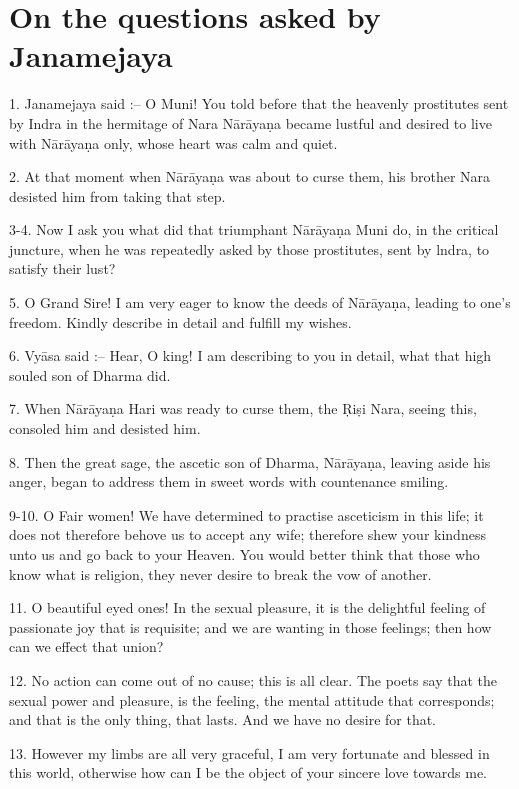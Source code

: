 \chapter{On the questions asked by Janamejaya}

1. Janamejaya said :-- O Muni! You told before that the heavenly prostitutes sent by Indra in the hermitage of Nara N\=ar\=aya\d{n}a became lustful and desired to live with N\=ar\=aya\d{n}a only, whose heart was calm and quiet.

2. At that moment when N\=ar\=aya\d{n}a was about to curse them, his brother Nara desisted him from taking that step.

3-4. Now I ask you what did that triumphant N\=ar\=aya\d{n}a Muni do, in the critical juncture, when he was repeatedly asked by those prostitutes, sent by lndra, to satisfy their lust?

5. O Grand Sire! I am very eager to know the deeds of N\=ar\=aya\d{n}a, leading to one's freedom. Kindly describe in detail and fulfill my wishes.

6. Vy\=asa said :-- Hear, O king! I am describing to you in detail, what that high souled son of Dharma did.

7. When N\=ar\=aya\d{n}a Hari was ready to curse them, the \d{R}i\d{s}i Nara, seeing this, consoled him and desisted him.

8. Then the great sage, the ascetic son of Dharma, N\=ar\=aya\d{n}a, leaving aside his anger, began to address them in sweet words with countenance smiling.

9-10. O Fair women! We have determined to practise asceticism in this life; it does not therefore behove us to accept any wife; therefore shew your kindness unto us and go back to your Heaven. You would better think that those who know what is religion, they never desire to break the vow of another.

11. O beautiful eyed ones! In the sexual pleasure, it is the delightful feeling of passionate joy that is requisite; and we are wanting in those feelings; then how can we effect that union?

12. No action can come out of no cause; this is all clear. The poets say that the sexual power and pleasure, is the feeling, the mental attitude that corresponds; and that is the only thing, that lasts. And we have no desire for that.

13. However my limbs are all very graceful, I am very fortunate and blessed in this world, otherwise how can I be the object of your sincere love towards me.

